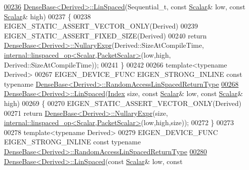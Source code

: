 \begin{DoxyCode}
\hyperlink{group___core___module_ad69f2e4769d8b4e667fafba18c9cfb56}{00236} \hyperlink{group___core___module_a35f222d8834f34fd358f2ef7bb52c888}{DenseBase<Derived>::LinSpaced}(Sequential\_t, \textcolor{keyword}{const} 
      \hyperlink{group___core___module_a5feed465b3a8e60c47e73ecce83e39a2}{Scalar}& low, \textcolor{keyword}{const} \hyperlink{group___core___module_a5feed465b3a8e60c47e73ecce83e39a2}{Scalar}& high)
00237 \{
00238   EIGEN\_STATIC\_ASSERT\_VECTOR\_ONLY(Derived)
00239   EIGEN\_STATIC\_ASSERT\_FIXED\_SIZE(Derived)
00240   \textcolor{keywordflow}{return} \hyperlink{group___core___module_class_eigen_1_1_dense_base}{DenseBase<Derived>::NullaryExpr}(Derived::SizeAtCompileTime, 
      \hyperlink{struct_eigen_1_1internal_1_1linspaced__op}{internal::linspaced\_op<Scalar,PacketScalar>}(low,high,
      Derived::SizeAtCompileTime));
00241 \}
00242 
00266 \textcolor{keyword}{template}<\textcolor{keyword}{typename} Derived>
00267 EIGEN\_DEVICE\_FUNC EIGEN\_STRONG\_INLINE \textcolor{keyword}{const} \textcolor{keyword}{typename} 
      \hyperlink{group___core___module_class_eigen_1_1_cwise_nullary_op}{DenseBase<Derived>::RandomAccessLinSpacedReturnType}
\hyperlink{group___core___module_a513c7986f48517c36f992a558f81e591}{00268} \hyperlink{group___core___module_a35f222d8834f34fd358f2ef7bb52c888}{DenseBase<Derived>::LinSpaced}(\hyperlink{namespace_eigen_a62e77e0933482dafde8fe197d9a2cfde}{Index} size, \textcolor{keyword}{const} 
      \hyperlink{group___core___module_a5feed465b3a8e60c47e73ecce83e39a2}{Scalar}& low, \textcolor{keyword}{const} \hyperlink{group___core___module_a5feed465b3a8e60c47e73ecce83e39a2}{Scalar}& high)
00269 \{
00270   EIGEN\_STATIC\_ASSERT\_VECTOR\_ONLY(Derived)
00271   \textcolor{keywordflow}{return} \hyperlink{group___core___module_class_eigen_1_1_dense_base}{DenseBase<Derived>::NullaryExpr}(size, 
      \hyperlink{struct_eigen_1_1internal_1_1linspaced__op}{internal::linspaced\_op<Scalar,PacketScalar>}(low,high,size));
00272 \}
00273 
00278 \textcolor{keyword}{template}<\textcolor{keyword}{typename} Derived>
00279 EIGEN\_DEVICE\_FUNC EIGEN\_STRONG\_INLINE \textcolor{keyword}{const} \textcolor{keyword}{typename} 
      \hyperlink{group___core___module_class_eigen_1_1_cwise_nullary_op}{DenseBase<Derived>::RandomAccessLinSpacedReturnType}
\hyperlink{group___core___module_a1dd502457286f60df1c3e90f9192c542}{00280} \hyperlink{group___core___module_a35f222d8834f34fd358f2ef7bb52c888}{DenseBase<Derived>::LinSpaced}(\textcolor{keyword}{const} \hyperlink{group___core___module_a5feed465b3a8e60c47e73ecce83e39a2}{Scalar}& low, \textcolor{keyword}{const} 

\end{DoxyCode}
